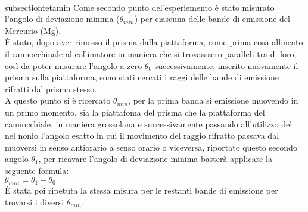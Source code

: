 \\subsection{tetamin}
    Come secondo punto del'esperiemento è stato misurato l'angolo di deviazione minima ($\theta_{min}$) per ciascuna delle bande di emissione del Mercurio (Mg).\\
    È stato, dopo aver rimosso il prisma dalla piattaforma, come prima cosa allineato il cannocchinale al collimatore in maniera che si trovasssero paralleli tra di loro, 
    così da poter misurare l'angolo a zero $\theta_{0}$ successivamente, inserito nuovamente il prisma sulla piattaforma, sono stati cercati i raggi delle bande di emissione 
    rifratti dal prisma stesso.\\
    A questo punto si è ricercato $\theta_{min}$, per la prima banda si emissione muovendo in un primo momento, sia la piattafoma del prisma che la piattaforma 
    del cannocchiale, in maniera grossolana e successivamente passando all'utilizzo del nel nonio l'angolo esatto in cui il movimento del raggio rifratto passava dal 
    muoversi in senso antiorario a senso orario o viceversa, riportato questo secondo angolo $\theta_{1}$, per ricavare l'angolo di deviazione minima basterà applicare 
    la seguente formula:\\

    $\theta_{min}=\theta_{1}-\theta_{0}$\\

    È stata poi ripetuta la stessa misura per le restanti bande di emissione per trovarsi i diversi $\theta_{min}$.\\
